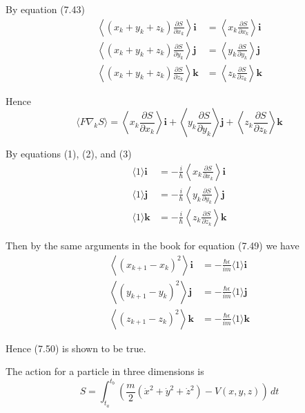 \documentclass[12pt]{article}
\begin{document}
By equation (7.43)
\begin{align*}
\left\langle(x_k+y_k+z_k)\frac{\partial S}{\partial x_k}\right\rangle\mathbf i
&=\left\langle x_k\frac{\partial S}{\partial x_k}\right\rangle\mathbf i
\\
\left\langle(x_k+y_k+z_k)\frac{\partial S}{\partial y_k}\right\rangle\mathbf j
&=\left\langle y_k\frac{\partial S}{\partial y_k}\right\rangle\mathbf j
\\
\left\langle(x_k+y_k+z_k)\frac{\partial S}{\partial z_k}\right\rangle\mathbf k
&=\left\langle z_k\frac{\partial S}{\partial z_k}\right\rangle\mathbf k
\end{align*}

Hence
\begin{equation*}
\langle F\nabla_kS\rangle
=\left\langle x_k\frac{\partial S}{\partial x_k}\right\rangle\mathbf i
+\left\langle y_k\frac{\partial S}{\partial y_k}\right\rangle\mathbf j
+\left\langle z_k\frac{\partial S}{\partial z_k}\right\rangle\mathbf k
\tag{3}
\end{equation*}

By equations (1), (2), and (3)
\begin{align*}
\langle1\rangle\mathbf i
&=-\frac{i}{\hbar}\left\langle x_k\frac{\partial S}{\partial x_k}\right\rangle\mathbf i
\\
\langle1\rangle\mathbf j
&=-\frac{i}{\hbar}\left\langle y_k\frac{\partial S}{\partial y_k}\right\rangle\mathbf j
\\
\langle1\rangle\mathbf k
&=-\frac{i}{\hbar}\left\langle z_k\frac{\partial S}{\partial z_k}\right\rangle\mathbf k
\end{align*}

Then by the same arguments in the book for equation (7.49) we have
\begin{align*}
\left\langle(x_{k+1}-x_k)^2\right\rangle\mathbf i&=-\frac{\hbar\epsilon}{im}\langle1\rangle\mathbf i
\\
\left\langle(y_{k+1}-y_k)^2\right\rangle\mathbf j&=-\frac{\hbar\epsilon}{im}\langle1\rangle\mathbf j
\\
\left\langle(z_{k+1}-z_k)^2\right\rangle\mathbf k&=-\frac{\hbar\epsilon}{im}\langle1\rangle\mathbf k
\end{align*}

Hence (7.50) is shown to be true.

\bigskip
The action for a particle in three dimensions is
\begin{equation*}
S=\int_{t_a}^{t_b}\left(\frac{m}{2}\left(\dot x^2+\dot y^2+\dot z^2\right)-V(x,y,z)\right)\,dt
\end{equation*}
\end{document}
